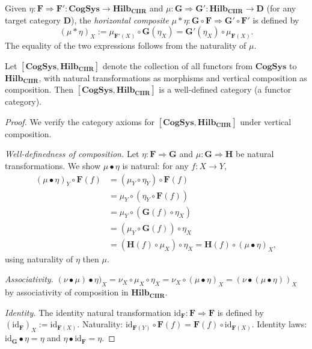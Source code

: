 \begin{definition}
\label{def:6.14}
Given $\eta : \mathbf{F} \Rightarrow \mathbf{F}' :
\mathbf{CogSys} \to \mathbf{Hilb_{CIIR}}$ and
$\mu : \mathbf{G} \Rightarrow \mathbf{G}' :
\mathbf{Hilb_{CIIR}} \to \mathbf{D}$ (for any target category
$\mathbf{D}$), the \emph{horizontal composite}
$\mu * \eta : \mathbf{G} \circ \mathbf{F} \Rightarrow \mathbf{G}' \circ
\mathbf{F}'$ is defined by
\[
  (\mu * \eta)_X := \mu_{\mathbf{F}'(X)} \circ \mathbf{G}(\eta_X)
  = \mathbf{G}'(\eta_X) \circ \mu_{\mathbf{F}(X)}.
\]
The equality of the two expressions follows from the naturality of $\mu$.
\end{definition}

\begin{theorem}
\label{thm:6.6}
Let $[\mathbf{CogSys}, \mathbf{Hilb_{CIIR}}]$ denote the collection
of all functors from $\mathbf{CogSys}$ to $\mathbf{Hilb_{CIIR}}$, with
natural transformations as morphisms and vertical composition as
composition.  Then $[\mathbf{CogSys}, \mathbf{Hilb_{CIIR}}]$ is a
well-defined category \textup{(}a functor category\textup{)}.
\end{theorem}

\begin{proof}
We verify the category axioms for
$[\mathbf{CogSys}, \mathbf{Hilb_{CIIR}}]$ under vertical composition.

\textit{Well-definedness of composition.}
Let $\eta : \mathbf{F} \Rightarrow \mathbf{G}$ and
$\mu : \mathbf{G} \Rightarrow \mathbf{H}$ be natural transformations.
We show $\mu \bullet \eta$ is natural: for any $f : X \to Y$,
\begin{align*}
  (\mu \bullet \eta)_Y \circ \mathbf{F}(f)
  &= (\mu_Y \circ \eta_Y) \circ \mathbf{F}(f) \\
  &= \mu_Y \circ (\eta_Y \circ \mathbf{F}(f)) \\
  &= \mu_Y \circ (\mathbf{G}(f) \circ \eta_X) \\
  &= (\mu_Y \circ \mathbf{G}(f)) \circ \eta_X \\
  &= (\mathbf{H}(f) \circ \mu_X) \circ \eta_X
  = \mathbf{H}(f) \circ (\mu \bullet \eta)_X,
\end{align*}
using naturality of $\eta$ then $\mu$.

\textit{Associativity.}
$(\nu \bullet \mu) \bullet \eta)_X
= \nu_X \circ \mu_X \circ \eta_X
= \nu_X \circ (\mu \bullet \eta)_X
= (\nu \bullet (\mu \bullet \eta))_X$
by associativity of composition in $\mathbf{Hilb_{CIIR}}$.

\textit{Identity.}
The identity natural transformation
$\mathrm{id}_{\mathbf{F}} : \mathbf{F} \Rightarrow \mathbf{F}$ is
defined by $(\mathrm{id}_{\mathbf{F}})_X := \mathrm{id}_{\mathbf{F}(X)}$.
Naturality: $\mathrm{id}_{\mathbf{F}(Y)} \circ \mathbf{F}(f) =
\mathbf{F}(f) \circ \mathrm{id}_{\mathbf{F}(X)}$.
Identity laws: $\mathrm{id}_{\mathbf{G}} \bullet \eta = \eta$ and
$\eta \bullet \mathrm{id}_{\mathbf{F}} = \eta$.
\end{proof}

